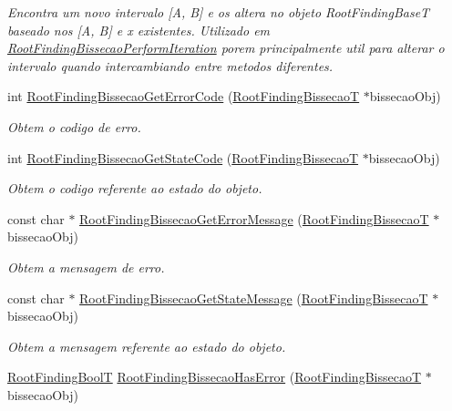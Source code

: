 \begin{CompactItemize}
\begin{CompactList}\small\item\em Encontra um novo intervalo \mbox{[}A, B\mbox{]} e os altera no objeto RootFindingBaseT baseado nos \mbox{[}A, B\mbox{]} e x existentes. Utilizado em \hyperlink{group____bissecao_g00f707bfd08d203eb0b941b6b09e5639}{RootFindingBissecaoPerformIteration} porem principalmente util para alterar o intervalo quando intercambiando entre metodos diferentes. \item\end{CompactList}\item 
int \hyperlink{group____bissecao_g9672d1ca4387db1792f8219968118900}{RootFindingBissecaoGetErrorCode} (\hyperlink{structRootFindingBissecao}{RootFindingBissecaoT} $\ast$bissecaoObj)
\begin{CompactList}\small\item\em Obtem o codigo de erro. \item\end{CompactList}\item 
int \hyperlink{group____bissecao_g2ab4fb7daf5901001d011ee85dc4cfe0}{RootFindingBissecaoGetStateCode} (\hyperlink{structRootFindingBissecao}{RootFindingBissecaoT} $\ast$bissecaoObj)
\begin{CompactList}\small\item\em Obtem o codigo referente ao estado do objeto. \item\end{CompactList}\item 
const char $\ast$ \hyperlink{group____bissecao_g77e94d3a9b5999461aabeca3bfe1837a}{RootFindingBissecaoGetErrorMessage} (\hyperlink{structRootFindingBissecao}{RootFindingBissecaoT} $\ast$bissecaoObj)
\begin{CompactList}\small\item\em Obtem a mensagem de erro. \item\end{CompactList}\item 
const char $\ast$ \hyperlink{group____bissecao_gb0455a1f4f30b2e8916d9dff5c237be1}{RootFindingBissecaoGetStateMessage} (\hyperlink{structRootFindingBissecao}{RootFindingBissecaoT} $\ast$bissecaoObj)
\begin{CompactList}\small\item\em Obtem a mensagem referente ao estado do objeto. \item\end{CompactList}\item 
\hyperlink{RootFindingCommon_8h_31228d356f5429fa5ba7f206e4dee12f}{RootFindingBoolT} \hyperlink{group____bissecao_gbcac5093ad9f3d46feb5d7eb89bb2a75}{RootFindingBissecaoHasError} (\hyperlink{structRootFindingBissecao}{RootFindingBissecaoT} $\ast$bissecaoObj)

\end{CompactItemize}
